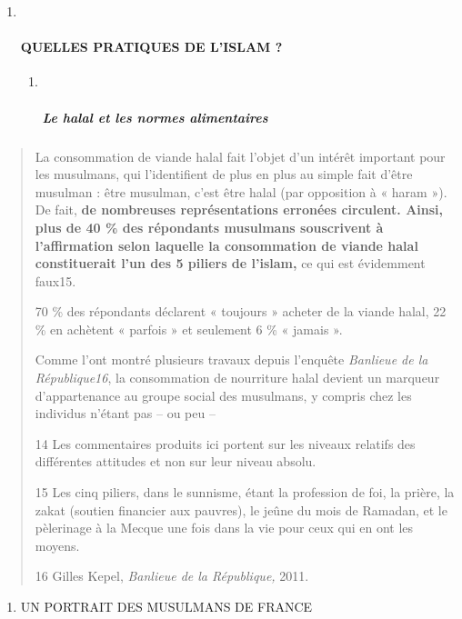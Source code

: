 \begin{enumerate}
\def\labelenumi{\arabic{enumi}.}
\item ~
  \hypertarget{quelles-pratiques-de-lislam}{%
  \paragraph{QUELLES PRATIQUES DE L'ISLAM
  ?}\label{quelles-pratiques-de-lislam}}

  \begin{enumerate}
  \def\labelenumii{\arabic{enumii}.}
  \item ~
    \hypertarget{le-halal-et-les-normes-alimentaires}{%
    \subparagraph{Le halal et les normes
    alimentaires}\label{le-halal-et-les-normes-alimentaires}}
  \end{enumerate}
\end{enumerate}

\begin{quote}
La consommation de viande halal fait l'objet d'un intérêt important pour
les musulmans, qui l'identifient de plus en plus au simple fait d'être
musulman : être musulman, c'est être halal (par opposition à « haram »).
De fait, \textbf{de nombreuses représentations erronées circulent.
Ainsi, plus de 40 \% des répondants musulmans souscrivent à
l'affirmation selon laquelle la consommation de viande halal
constituerait l'un des 5 piliers de l'islam,} ce qui est évidemment
faux15.

70 \% des répondants déclarent « toujours » acheter de la viande halal,
22 \% en achètent « parfois » et seulement 6 \% « jamais ».

Comme l'ont montré plusieurs travaux depuis l'enquête \emph{Banlieue de
la République16}, la consommation de nourriture halal devient un
marqueur d'appartenance au groupe social des musulmans, y compris chez
les individus n'étant pas -- ou peu --

14 Les commentaires produits ici portent sur les niveaux relatifs des
différentes attitudes et non sur leur niveau absolu.

15 Les cinq piliers, dans le sunnisme, étant la profession de foi, la
prière, la zakat (soutien financier aux pauvres), le jeûne du mois de
Ramadan, et le pèlerinage à la Mecque une fois dans la vie pour ceux qui
en ont les moyens.

16 Gilles Kepel, \emph{Banlieue de la République,} 2011.
\end{quote}

\begin{enumerate}
\def\labelenumi{\Roman{enumi}.}
\item
  UN PORTRAIT DES MUSULMANS DE FRANCE
\end{enumerate}

